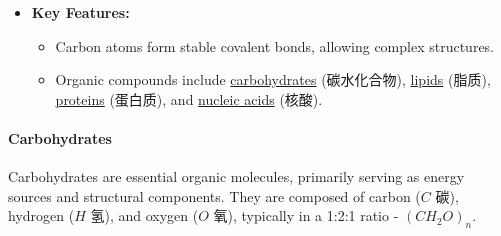 \begin{itemize}
\begin{figure}[H]
{        diagrams we use one of several different ways to draw them.}
    \end{figure}
    \item \textbf{Key Features:}
    \begin{itemize}
        \item Carbon atoms form stable covalent bonds, allowing complex structures.
        \item Organic compounds include \underline{carbohydrates} (碳水化合物), \underline{lipids} (脂质), \underline{proteins}
        (蛋白质), and \underline{nucleic acids} (核酸).
    \end{itemize}
\end{itemize}

\paragraph{Carbohydrates}
Carbohydrates are essential organic molecules, primarily serving as energy sources and structural components. They are composed
of carbon ($C$ 碳), hydrogen ($H$ 氢), and oxygen ($O$ 氧), typically in a 1:2:1 ratio - $\left(CH_2O\right)_n$.

